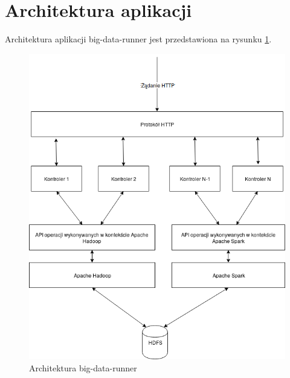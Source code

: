 \section{Architektura aplikacji}
Architektura aplikacji big-data-runner jest przedstawiona na rysunku \ref{fig:@=big-data-runner_arch}. 
\begin{figure}[!htb]
	\centering
	\includegraphics[scale=0.4]{big-data-runner-architecture.png}
	\caption{Architektura big-data-runner}
	\label{fig:@=big-data-runner_arch}
\end{figure}
